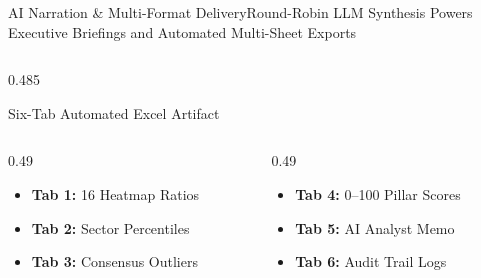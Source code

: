 \begin{frame}{AI Narration \& Multi-Format Delivery}{Round-Robin LLM Synthesis Powers Executive Briefings and Automated Multi-Sheet Exports}
\begin{columns}[T,onlytextwidth]
\begin{column}{0.485\textwidth}
\begin{quantcard}[height=2.74cm]{Six-Tab Automated Excel Artifact}
                \begin{columns}[T,totalwidth=\linewidth]
                    \begin{column}{0.49\linewidth}
                        \begin{itemize}
                            \setlength{\itemsep}{0.8pt}
                            \item \textbf{Tab 1:} 16 Heatmap Ratios
                            \item \textbf{Tab 2:} Sector Percentiles
                            \item \textbf{Tab 3:} Consensus Outliers
                        \end{itemize}
                    \end{column}
                    \begin{column}{0.49\linewidth}
                        \begin{itemize}
                            \setlength{\itemsep}{0.8pt}
                            \item \textbf{Tab 4:} 0--100 Pillar Scores
                            \item \textbf{Tab 5:} AI Analyst Memo
                            \item \textbf{Tab 6:} Audit Trail Logs
                        \end{itemize}
                    \end{column}
                \end{columns}
                \vspace{3pt}
            \end{quantcard}
        \end{column}
    \end{columns}
\end{frame}
